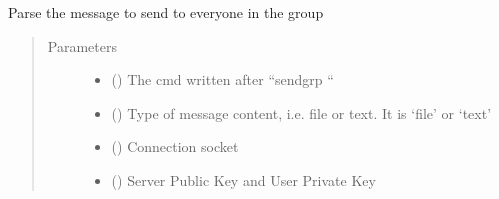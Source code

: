 \documentclass[letterpaper,10pt,english]{sphinxmanual}
\begin{document}
\begin{fulllineitems}
\label{\detokenize{userInputHandler:userInputHandler.sendGroupMessage}}
Parse the message to send to everyone in the group
\begin{quote}\begin{description}
\item[{Parameters}] \leavevmode\begin{itemize}
\item {} 
 () \textendash{} The cmd written after “sendgrp “

\item {} 
 () \textendash{} Type of message content, i.e. file or text. It is ‘file’ or ‘text’

\item {} 
 () \textendash{} Connection socket

\item {} 
 () \textendash{} Server Public Key and User Private Key

\end{itemize}

\end{description}\end{quote}

\end{fulllineitems}

\end{document}

